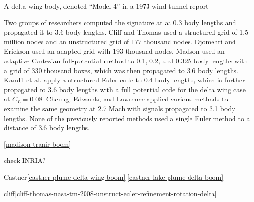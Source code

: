 \documentclass{article}
\begin{document}
A delta wing body,
denoted ``Model 4'' in a 1973 wind tunnel report%
\cite{wing-planform-boom-wt-tn-7160}


Two groups of researchers computed the signature at
at 0.3 body lengths and propagated it to 3.6 body lengths.
Cliff and Thomas\cite{cliff-thomas-boom}
used a structured grid of 1.5 million nodes and
an unstructured grid of 177 thousand nodes.
Djomehri and Erickson\cite{felisa-adapt-boom}
used an adapted grid with 193 thousand nodes.
Madson\cite{madison-tranir-boom} used 
an adaptive Cartesian full-potential
method to 0.1, 0.2, and 0.325 body lengths with
a grid of 330 thousand boxes,
which was then propagated to 3.6 body lengths.
Kandil et al.\cite{kandil-ssbe} apply a 
structured Euler code to 0.4 body lengths,
which is further propagated to 3.6 body lengths
with a full potential code for the delta wing case at $C_L=0.08$.
Cheung, Edwards, and Lawrence\cite{cheung-edwards-lawrence-cfd-boom-extrap} 
applied various methods
to examine the same geometry at 2.7 Mach 
with signals propagated to 3.1 body lengths.
None of the previously reported methods used a single
Euler method to a distance of 3.6 body lengths.

\ref{madison-tranir-boom}

check INRIA?

Castner\ref{castner-plume-delta-wing-boom}
\ref{castner-lake-plume-delta-boom}

cliff\ref{cliff-thomas-nasa-tm-2008-unstruct-euler-refinement-rotation-delta}





\end{document}
